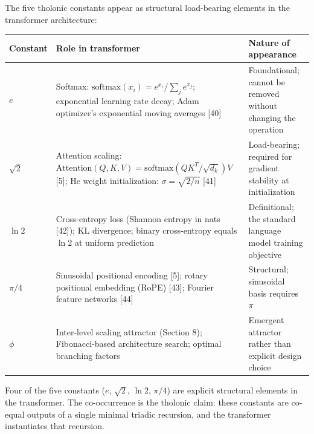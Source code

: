 \documentclass[12pt]{article}
\begin{document}
The five tholonic constants appear as structural load-bearing elements
in the transformer architecture:

\begin{longtable}[]{@{}
  >{\raggedright\arraybackslash}p{}
  >{\raggedright\arraybackslash}p{}
  >{\raggedright\arraybackslash}p{}@{}}
\toprule\noalign{}
\begin{minipage}[b]{\linewidth}\raggedright
Constant
\end{minipage} & \begin{minipage}[b]{\linewidth}\raggedright
Role in transformer
\end{minipage} & \begin{minipage}[b]{\linewidth}\raggedright
Nature of appearance
\end{minipage} \\
\midrule\noalign{}
\endhead
\bottomrule\noalign{}
\endlastfoot
\(e\) & Softmax: \(\text{softmax}(x_i) = e^{x_i}/\sum_j e^{x_j}\);
exponential learning rate decay; Adam optimizer's exponential moving
averages {[}40{]} & Foundational; cannot be removed without changing the
operation \\
\(\sqrt{2}\) & Attention scaling:
\(\text{Attention}(Q,K,V) = \text{softmax}(QK^T/\sqrt{d_k})V\) {[}5{]};
He weight initialization: \(\sigma = \sqrt{2/n}\) {[}41{]} &
Load-bearing; required for gradient stability at initialization \\
\(\ln 2\) & Cross-entropy loss (Shannon entropy in nats {[}42{]}); KL
divergence; binary cross-entropy equals \(\ln 2\) at uniform prediction
& Definitional; the standard language model training objective \\
\(\pi/4\) & Sinusoidal positional encoding {[}5{]}; rotary positional
embedding (RoPE) {[}43{]}; Fourier feature networks {[}44{]} &
Structural; sinusoidal basis requires \(\pi\) \\
\(\phi\) & Inter-level scaling attractor (Section 8); Fibonacci-based
architecture search; optimal branching factors & Emergent attractor
rather than explicit design choice \\
\end{longtable}

Four of the five constants (\(e\), \(\sqrt{2}\), \(\ln 2\), \(\pi/4\))
are explicit structural elements in the transformer. The co-occurrence
is the tholonic claim: these constants are co-equal outputs of a single
minimal triadic recursion, and the transformer instantiates that
recursion.
\end{document}
